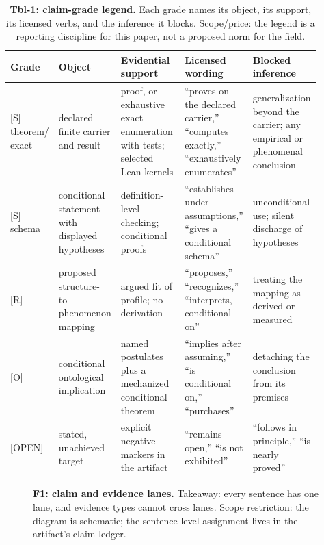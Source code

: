 \documentclass[11pt]{article}
\newcommand{\gradeS}{\textsf{[S]}}
\newcommand{\gradeR}{\textsf{[R]}}
\newcommand{\gradeO}{\textsf{[O]}}
\newcommand{\gradeOpen}{\textsf{[OPEN]}}
\theoremstyle{definition}
\begin{document}
\begin{table}[t]
\centering\small
\begin{tabular}{p{0.1\linewidth}p{0.2\linewidth}p{0.22\linewidth}p{0.18\linewidth}p{0.2\linewidth}}
\toprule
Grade & Object & Evidential support & Licensed wording & Blocked inference \\
\midrule
\gradeS{} theorem/ exact & declared finite carrier and result & proof, or exhaustive exact enumeration with tests; selected Lean kernels & ``proves on the declared carrier,'' ``computes exactly,'' ``exhaustively enumerates'' & generalization beyond the carrier; any empirical or phenomenal conclusion \\
\gradeS{} schema & conditional statement with displayed hypotheses & definition-level checking; conditional proofs & ``establishes under assumptions,'' ``gives a conditional schema'' & unconditional use; silent discharge of hypotheses \\
\gradeR{} & proposed structure-to-phenomenon mapping & argued fit of profile; no derivation & ``proposes,'' ``recognizes,'' ``interprets, conditional on'' & treating the mapping as derived or measured \\
\gradeO{} & conditional ontological implication & named postulates plus a mechanized conditional theorem & ``implies after assuming,'' ``is conditional on,'' ``purchases'' & detaching the conclusion from its premises \\
\gradeOpen{} & stated, unachieved target & explicit negative markers in the artifact & ``remains open,'' ``is not exhibited'' & ``follows in principle,'' ``is nearly proved'' \\
\bottomrule
\end{tabular}
\caption{\textbf{Tbl-1: claim-grade legend.} Each grade names its object, its
support, its licensed verbs, and the inference it blocks. Scope/price: the
legend is a reporting discipline for this paper, not a proposed norm for the
field.}
\label{tbl:grades}
\end{table}

\begin{figure}[t]
\centering
{}
\caption{\textbf{F1: claim and evidence lanes.} Takeaway: every sentence has
one lane, and evidence types cannot cross lanes. Scope restriction: the
diagram is schematic; the sentence-level assignment lives in the artifact's
claim ledger.}
\label{fig:lanes}
\end{figure}
\end{document}
